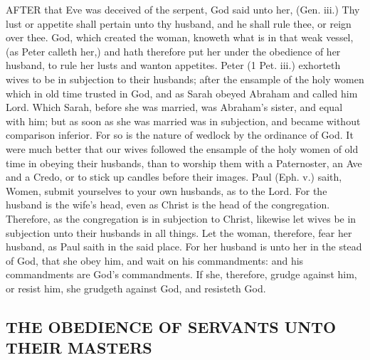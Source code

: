 AFTER that Eve was deceived of the serpent, God said 
unto her, (Gen. iii.) Thy lust or appetite shall pertain 
unto thy husband, and he shall rule thee, or reign over
thee. God, which created the woman, knoweth what is
in that weak vessel, (as Peter calleth her,) and hath therefore
put her under the obedience of her husband, to rule her 
lusts and wanton appetites. Peter (1 Pet. iii.) exhorteth 
wives to be in subjection to their husbands; after the ensample
of the holy women which in old time trusted in 
God, and as Sarah obeyed Abraham and called him 
Lord. Which Sarah, before she was married, was
Abraham's sister, and equal with him; but as 
soon as she was married was in subjection, and became 
without comparison inferior. For so is the nature of 
wedlock by the ordinance of God. It were much better 
that our wives followed the ensample of the holy women of 
old time in obeying their husbands, than to worship them 
with a Paternoster, an Ave and a Credo, or to stick up 
candles before their images. Paul (Eph. v.) saith, Women, 
submit yourselves to your own husbands, as to the
Lord. For the husband is the wife's head, even as Christ is 
the head of the congregation. Therefore, as the congregation 
is in subjection to Christ, likewise let wives be in subjection
unto their husbands in all things. Let the woman, 
therefore, fear her husband, as Paul saith in the said place. 
For her husband is unto her in the stead of God, that she 
obey him, and wait on his commandments: and his commandments
are God's commandments. If she, therefore, 
grudge against him, or resist him, she grudgeth against 
God, and resisteth God.


\subsection*{THE OBEDIENCE OF SERVANTS UNTO THEIR MASTERS}

